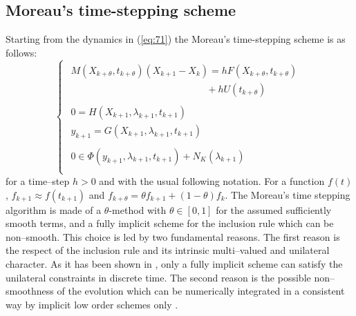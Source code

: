 \subsection{Moreau's time-stepping scheme}


Starting from the dynamics in (\ref{eq:71}) the Moreau's time-stepping scheme  is as follows:
\label{section24}
\begin{equation}
  \label{eq:71-discrete}
 \left\{ \begin{array}{l}
    \begin{array}{l}
  M(X_{k+\theta},t_{k+\theta}) (X_{k+1}-X_{k}) = h F(X_{k+\theta},t_{k+\theta}) \\
  \qquad  \qquad  \qquad  \qquad \qquad  \qquad  \qquad + h U(t_{k+\theta})
\end{array}\\[2mm]
  \begin{array}{l}
    0 = H(X_{k+1},\lambda_{k+1},t_{k+1})\\
    y_{k+1} = G(X_{k+1},\lambda_{k+1},t_{k+1}) 
  \end{array} \\[5mm]
  \begin{array}{l}
  0 \in \Phi(y_{k+1},\lambda_{k+1},t_{k+1}) + N_K(\lambda_{k+1})
\end{array} \\
\end{array}\right.
\end{equation}
for a time--step $h>0$ and with the usual following notation. For a function $f(t)$, $ f_{k+1}
\approx f(t_{k+1})$ and $f_{k+\theta} = \theta f_{k+1} + (1-\theta) f_{k}$. The Moreau's time
stepping algorithm is made of a $\theta$-method with $\theta \in [0,1]$ for the assumed sufficiently
smooth terms, and a fully implicit scheme for the inclusion rule which can be non--smooth. This
choice is led by two fundamental reasons. The first reason is the respect of the inclusion rule and
its intrinsic multi--valued and unilateral character.  As it has been shown in \cite{Moreau1977},
only a fully implicit scheme can satisfy the unilateral constraints in discrete time. The second
reason is the possible non--smoothness of the evolution  which  can be numerically integrated in a
consistent way by implicit low order schemes only \cite{acary-brogliato2008}.


